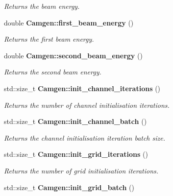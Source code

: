 \begin{DoxyCompactItemize}
\begin{DoxyCompactList}\small\item\em Returns the beam energy. \end{DoxyCompactList}\item 
\hypertarget{a00878_a7df898d0a648b1b85f8418ed1a5373c2}{}double {\bfseries Camgen\+::first\+\_\+beam\+\_\+energy} ()\label{a00878_a7df898d0a648b1b85f8418ed1a5373c2}

\begin{DoxyCompactList}\small\item\em Returns the first beam energy. \end{DoxyCompactList}\item 
\hypertarget{a00878_af8724feea3036bf30679759e8674ff86}{}double {\bfseries Camgen\+::second\+\_\+beam\+\_\+energy} ()\label{a00878_af8724feea3036bf30679759e8674ff86}

\begin{DoxyCompactList}\small\item\em Returns the second beam energy. \end{DoxyCompactList}\item 
\hypertarget{a00878_a4701d84b84d92950210c29d707d5ff19}{}std\+::size\+\_\+t {\bfseries Camgen\+::init\+\_\+channel\+\_\+iterations} ()\label{a00878_a4701d84b84d92950210c29d707d5ff19}

\begin{DoxyCompactList}\small\item\em Returns the number of channel initialisation iterations. \end{DoxyCompactList}\item 
\hypertarget{a00878_a909df520c28dcb343bb45c0484c18e33}{}std\+::size\+\_\+t {\bfseries Camgen\+::init\+\_\+channel\+\_\+batch} ()\label{a00878_a909df520c28dcb343bb45c0484c18e33}

\begin{DoxyCompactList}\small\item\em Returns the channel initialisation iteration batch size. \end{DoxyCompactList}\item 
\hypertarget{a00878_aec199dad2e3a981732f1b754ef780907}{}std\+::size\+\_\+t {\bfseries Camgen\+::init\+\_\+grid\+\_\+iterations} ()\label{a00878_aec199dad2e3a981732f1b754ef780907}

\begin{DoxyCompactList}\small\item\em Returns the number of grid initialisation iterations. \end{DoxyCompactList}\item 
\hypertarget{a00878_abc620352fdb254351d0bd992fa6ad8e0}{}std\+::size\+\_\+t {\bfseries Camgen\+::init\+\_\+grid\+\_\+batch} ()\label{a00878_abc620352fdb254351d0bd992fa6ad8e0}


\end{DoxyCompactItemize}
